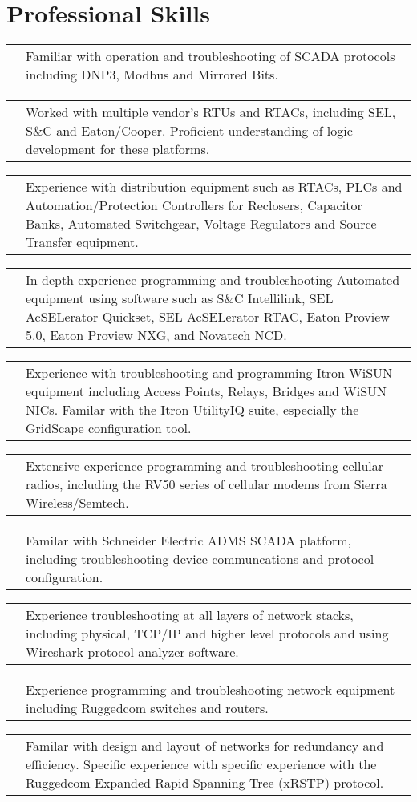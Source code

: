 \documentclass[11pt,letterpaper,sans]{moderncv}
\makeatletter
\newcommand*{\ccvitem}[3][.25em]{%
	\begin{tabular}{@{}m{\hintscolumnwidth}@{\hspace{\separatorcolumnwidth}}m{\maincolumnwidth}@{}}%
		\raggedleft\hintstyle{#2} &{#3}%
	\end{tabular}%
	\par\addvspace{#1}}
\makeatother
\begin{document}

\section{Professional Skills}
\ccvitem[0.75em]{Distribution Automation}{Familiar with operation and troubleshooting of SCADA protocols including DNP3, Modbus and Mirrored Bits.}

\ccvitem[0.75em]{Distribution Automation}{Worked with multiple vendor's RTUs and RTACs, including SEL, S\&C and Eaton/Cooper.
	Proficient understanding of logic development for these platforms.}

\ccvitem[0.75em]{Distribution Automation}{Experience with distribution equipment such as RTACs, PLCs and
	Automation/Protection Controllers for Reclosers, Capacitor Banks,
	Automated Switchgear, Voltage Regulators and Source Transfer equipment.}

\ccvitem[0.75em]{Distribution Automation}{In-depth experience programming and troubleshooting Automated equipment
	using software such as S\&C Intellilink, SEL AcSELerator Quickset, SEL AcSELerator RTAC,
	Eaton Proview 5.0, Eaton Proview NXG, and Novatech NCD.}

\ccvitem[0.75em]{Radios and Communications}{Experience with troubleshooting and programming Itron WiSUN
	equipment including Access Points, Relays, Bridges and WiSUN NICs. Familar with
	the Itron UtilityIQ suite, especially the GridScape configuration tool.}

\ccvitem[0.75em]{Radios and Communications}{Extensive experience programming and troubleshooting cellular radios,
	including the RV50 series of cellular modems from Sierra Wireless/Semtech.}

\ccvitem[0.75em]{SCADA}{Familar with Schneider Electric ADMS SCADA platform, including troubleshooting
	device communcations and protocol configuration.}

\ccvitem[0.75em]{IT and Networking}{Experience troubleshooting at all layers of network stacks,
	including physical, TCP/IP and higher level protocols and using Wireshark protocol analyzer software.}

\ccvitem{IT and Networking}{Experience programming and troubleshooting network equipment including Ruggedcom switches and routers.}

\ccvitem[0.75em]{IT and Networking}{Familar with design and layout of networks for redundancy and efficiency. Specific experience
	with specific experience with the Ruggedcom Expanded Rapid Spanning Tree (xRSTP) protocol.}
\end{document}
